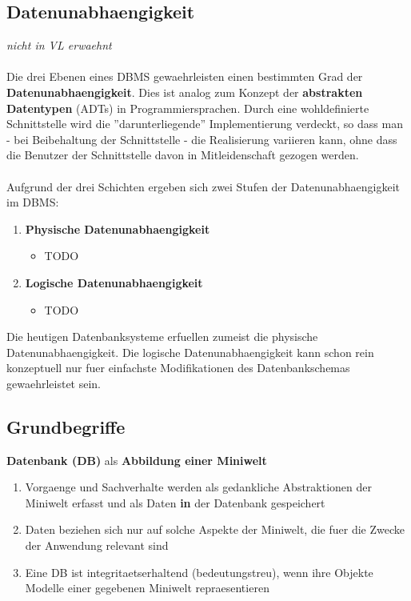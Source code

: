 \documentclass[a4paper,10pt]{article}
\begin{document}
\subsection{Datenunabhaengigkeit}
\emph{nicht in VL erwaehnt}
\\~\\
Die drei Ebenen eines DBMS gewaehrleisten einen bestimmten Grad der \textbf{Datenunabhaengigkeit}. Dies ist analog zum Konzept der \textbf{abstrakten Datentypen} (ADTs) in Programmiersprachen. Durch eine wohldefinierte Schnittstelle wird die ''darunterliegende'' Implementierung verdeckt, so dass man - bei Beibehaltung der Schnittstelle - die Realisierung variieren kann, ohne dass die Benutzer der Schnittstelle davon in Mitleidenschaft gezogen werden.
\\~\\
Aufgrund der drei Schichten ergeben sich zwei Stufen der Datenunabhaengigkeit im DBMS:
\begin{enumerate}
\item \textbf{Physische Datenunabhaengigkeit}
\begin{itemize}
\item TODO
\end{itemize}
\item \textbf{Logische Datenunabhaengigkeit}
\begin{itemize}
\item TODO
\end{itemize}
\end{enumerate}

Die heutigen Datenbanksysteme erfuellen zumeist die physische Datenunabhaengigkeit. Die logische Datenunabhaengigkeit kann schon rein konzeptuell nur fuer einfachste Modifikationen des Datenbankschemas gewaehrleistet sein.

\subsection{Grundbegriffe}
\textbf{Datenbank (DB)} als \textbf{Abbildung einer Miniwelt}
\begin{enumerate}
\item Vorgaenge und Sachverhalte werden als gedankliche Abstraktionen der Miniwelt erfasst und als Daten \textbf{in} der Datenbank gespeichert
\item Daten beziehen sich nur auf solche Aspekte der Miniwelt, die fuer die Zwecke der Anwendung relevant sind
\item Eine DB ist integritaetserhaltend (bedeutungstreu), wenn ihre Objekte Modelle einer gegebenen Miniwelt repraesentieren
\end{enumerate}
\end{document}

